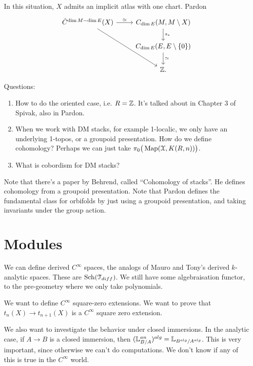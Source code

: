 In this situation, $X$ admits an implicit atlas with one chart. Pardon
\[
\begin{tikzcd}
\check{C}^{\dim M - \dim E}(X)\arrow{r}{\simeq}\arrow{ddr} & 	C_{\dim E} (M, M \setminus X)\arrow{d}{s_*} \\
 & C_{\dim E}(E , E \setminus \{0\})\arrow{d}{\simeq} \\
 & \Z .	
\end{tikzcd}
\]

Questions:
\begin{enumerate}
\item How to do the oriented case, i.e. $R = \mathbb Z$. It's talked about in Chapter 3 of Spivak, also in Pardon.
\item When we work with DM stacks, for example 1-localic, we only have an underlying 1-topos, or a groupoid presentation. How
do we define cohomology? Perhaps we can just take $\pi_0\big(\operatorname{Map}(\mathcal{X}, K(R,n))\big)$.
\item What is cobordism for DM stacks?
\end{enumerate}

Note that there's a paper by Behrend, called ``Cohomology of stacks''. He defines cohomology from a groupoid presentation. Note that
Pardon defines the fundamental class for orbifolds by just using a groupoid presentation, and taking invariants under the group
action.



\section{Modules}
We can define derived $C^{\infty}$ spaces, the analogs of Mauro and Tony's derived $k$-analytic spaces. These are 
$\mathrm{Sch}(\mathcal{T}_{diff})$. We still have some algebraisation functor, to the pre-geometry where we only take polynomials.

We want to define $C^{\infty}$ square-zero extensions. We want to prove that $t_n(X) \to t_{n+1}(X)$ is a $C^{\infty}$ square
zero extension.

We also want to investigate the behavior under closed immersions. In the analytic case, if $A \to B$ is a closed immersion, then
$(\mathbb L_{B/A}^{an})^{alg} = \mathbb L_{B^{alg}/A^{alg}}$. This is very important, since otherwise we can't do computations. We don't know
if any of this is true in the $C^{\infty}$ world.